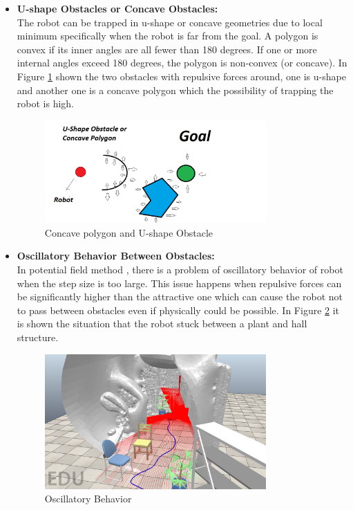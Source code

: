 \begin{itemize}
      \item  \textbf{ U-shape Obstacles or Concave Obstacles: }\\
      The robot can be trapped in u-shape or concave geometries due to local minimum specifically when the robot is far from the goal.   
      A polygon is convex if its inner angles are all fewer than 180 degrees. If one or more internal angles exceed 180 degrees, the polygon is non-convex (or concave). In Figure \ref{fig:Concave polygon and U-shape Obstacle} shown the two obstacles with repulsive forces around, one is u-shape and another one is a concave polygon which the possibility of trapping the robot is high. 
\begin{figure}[H]
  \centering
  \includegraphics[width= 0.8\textwidth]{Figures/Concave polygon and U-shape.png}
  \caption[Concave polygon and U-shape Obstacle]{Concave polygon and U-shape Obstacle}
   \label{fig:Concave polygon and U-shape Obstacle}
\end{figure}
       \item  \textbf{ Oscillatory Behavior Between Obstacles: }\\
       In potential field method , there is a problem of oscillatory behavior of robot when the step size is too large. This issue happens when repulsive forces can be significantly higher than the attractive one which can cause the robot not to pass between obstacles even if physically could be possible. In Figure \ref{fig:Oscillatory Behavior} it is shown the situation that the robot stuck between a plant and hall structure.  
\begin{figure}[H]
  \centering
  \includegraphics[width= 0.8\textwidth]{Figures/Oscillatory stuck.PNG}
  \caption[Oscillatory Behavior]{Oscillatory Behavior}
   \label{fig:Oscillatory Behavior}
\end{figure}


\end{itemize}
